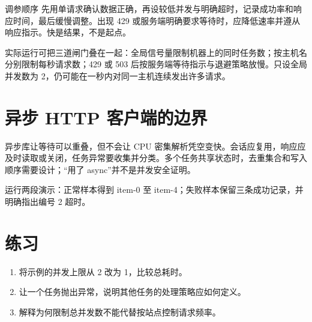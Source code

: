 \begin{method}{调参顺序}
先用单请求确认数据正确，再设较低并发与明确超时，记录成功率和响应时间，最后缓慢调整。出现 429 或服务端明确要求等待时，应降低速率并遵从响应指示。快是结果，不是起点。
\end{method}

实际运行可把三道闸门叠在一起：全局信号量限制机器上的同时任务数；按主机名分别限制每秒请求数；429 或 503 后按服务端等待指示与退避策略放慢。只设全局并发数为 2，仍可能在一秒内对同一主机连续发出许多请求。

\section{异步 HTTP 客户端的边界}
异步库让等待可以重叠，但不会让 CPU 密集解析凭空变快。会话应复用，响应应及时读取或关闭，任务异常要收集并分类。多个任务共享状态时，去重集合和写入顺序需要设计；“用了 async”并不是并发安全证明。

\begin{tcolorbox}[title=本章验收,colframe=Teal,colback=Teal!3]
运行两段演示：正常样本得到 item-0 至 item-4；失败样本保留三条成功记录，并明确指出编号 2 超时。
\end{tcolorbox}

\section{练习}
\begin{enumerate}[label=\arabic*.]
\item 将示例的并发上限从 2 改为 1，比较总耗时。
\item 让一个任务抛出异常，说明其他任务的处理策略应如何定义。
\item 解释为何限制总并发数不能代替按站点控制请求频率。
\end{enumerate}
